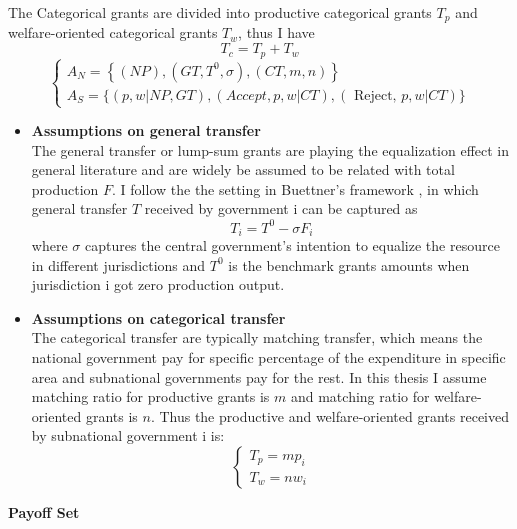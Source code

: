 The Categorical grants are divided into productive categorical grants $T_{p}$ and welfare-oriented categorical grants $T_{w}$, thus I have
$$T_c = T_{p} + T_{w} $$ \label{catetransfer}
$$
    \left\{\begin{array}{l}
        A_N=\left\{(NP), \left(G T, T^0, \sigma\right), (C T, m, n)\right\} \\
        A_S=\{(p, w|NP, GT), (A c c e p t, p, w| CT), (\text { Reject, } p, w| CT)\}
    \end{array}\right.
$$ \label{generalandcategorical}
\begin{itemize}
    \item \textbf{Assumptions on general transfer}\\
          The general transfer or lump-sum grants are playing the equalization effect in general literature and are widely be assumed to be related with total production $F$. \label{F} I follow the the setting in Buettner's framework \cite{buettner2006incentive}, in which general transfer $T$ received by government i can be captured as
          $$T_i = T^0 - \sigma F_i $$
          where $\sigma$ captures the central government's intention to equalize the resource in different jurisdictions and $T^0$ is the benchmark grants amounts when jurisdiction i got zero production output.\\
    \item \textbf{Assumptions on categorical transfer}\\
          The categorical transfer are typically matching transfer, which means the national government pay for specific percentage of the expenditure in specific area and subnational governments pay for the rest. In this thesis I assume matching ratio for productive grants is $m$ and matching ratio for welfare-oriented grants is $n$. Thus the productive and welfare-oriented grants received by subnational government i is:
          $$
              \left\{\begin{array}{l}
                  T_p=m p_i \\
                  T_w=n w_i
              \end{array}\right.
          $$
\end{itemize}
\item \textbf{Payoff Set}\\
